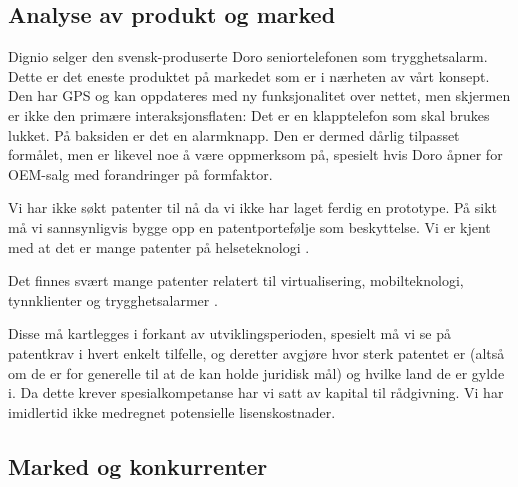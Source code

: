 \subsection{Analyse av produkt og marked}


Dignio selger den svensk-produserte Doro seniortelefonen som trygghetsalarm.
Dette er det eneste produktet på markedet som er i nærheten av vårt konsept.
Den har GPS og kan oppdateres med ny funksjonalitet over nettet, men skjermen
er ikke den primære interaksjonsflaten: Det er en klapptelefon som skal brukes
lukket. På baksiden er det en alarmknapp.  Den er dermed dårlig tilpasset
formålet, men er likevel noe å være oppmerksom på, spesielt hvis Doro åpner for
OEM-salg med forandringer på formfaktor.

Vi har ikke søkt patenter til nå da vi ikke har laget ferdig en prototype. På
sikt må vi sannsynligvis bygge opp en patentportefølje som beskyttelse. Vi er
kjent med at det er mange patenter på helseteknologi \cite{slides.chery}.

Det finnes svært mange patenter relatert til virtualisering, mobilteknologi,
tynnklienter og trygghetsalarmer \cite{patent.ricordi2008mobile,
patent.heinz2013wearable}.

Disse må kartlegges i forkant av utviklingsperioden, spesielt må vi se på
patentkrav i hvert enkelt tilfelle, og deretter avgjøre hvor sterk patentet er
(altså om de er for generelle til at de kan holde juridisk mål) og hvilke land
de er gylde i. Da dette krever spesialkompetanse har vi satt av kapital til
rådgivning. Vi har imidlertid ikke medregnet potensielle lisenskostnader.

\subsection{Marked og konkurrenter}



